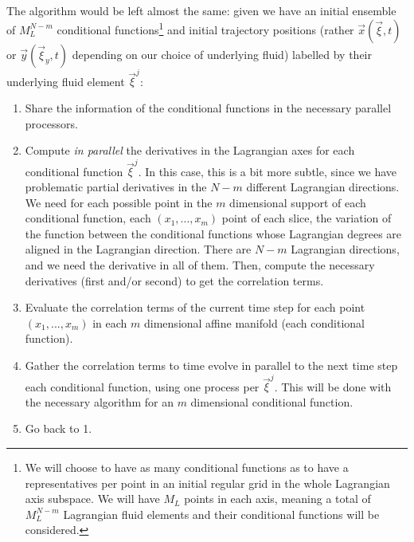 \documentclass[11pt, a4paper]{article} %
\begin{document}
The algorithm would be left almost the same: given we have an initial ensemble of $M_L^{N-m}$ conditional functions\footnote{We will choose to have as many conditional functions as to have a representatives per point in an initial regular grid in the whole Lagrangian axis subspace. We will have $M_L$ points in each axis, meaning a total of $M_L^{N-m}$ Lagrangian fluid elements and their conditional functions will be considered.} and initial trajectory positions (rather $\vec{x}(\vec{\xi},t)$ or $\vec{y}(\vec{\xi}_y,t)$ depending on our choice of underlying fluid) labelled by their underlying fluid element $\vec{\xi}^j$:
\begin{enumerate}
\item Share the information of the conditional functions in the necessary parallel processors.
\item Compute {\em in parallel} the derivatives in the Lagrangian axes for each conditional function $\vec{\xi}^j$. In this case, this is a bit more subtle, since we have problematic partial derivatives in the $N-m$ different Lagrangian directions. We need for each possible point in the $m$ dimensional support of each conditional function, each $(x_1,...,x_{m})$ point of each slice, the variation of the function between the conditional functions whose Lagrangian degrees are aligned in the Lagrangian direction. There are $N-m$ Lagrangian directions, and we need the derivative in all of them. Then, compute the necessary derivatives (first and/or second) to get the correlation terms.
\item Evaluate the correlation terms of the current time step for each point $(x_1,...,x_{m})$ in each $m$ dimensional affine manifold (each conditional function).

\item Gather the correlation terms to time evolve in parallel to the next time step each conditional function, using one process per $\vec{\xi}^j$. This will be done with the necessary algorithm for an $m$ dimensional conditional function.
\item Go back to 1.
\end{enumerate}
\end{document}
